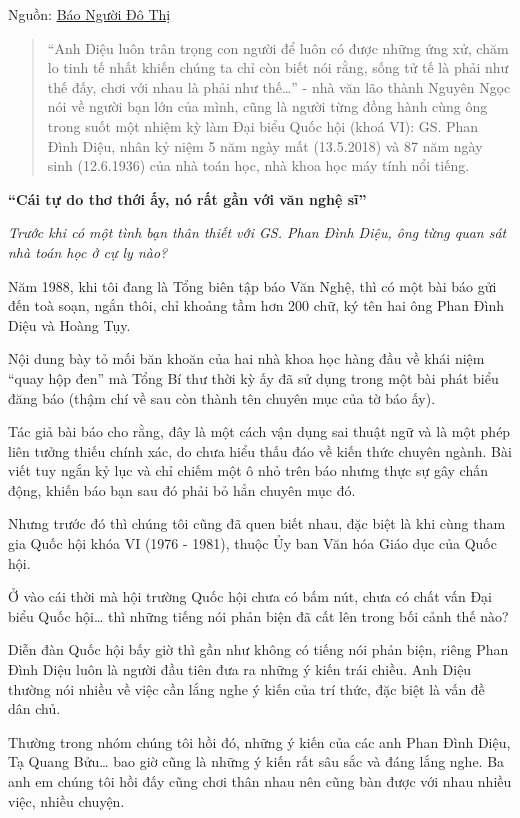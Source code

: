 Nguồn: \href{https://nguoidothi.net.vn/nha-van-nguyen-ngoc-phan-dinh-dieu-da-song-mot-cuoc-doi-rat-dang-hoang-39640.html}{Báo Người Đô Thị}

\begin{quote}
“Anh Diệu luôn trân trọng con người để luôn có được những ứng xử, chăm lo tinh tế nhất khiến chúng ta chỉ còn biết nói rằng, sống tử tế là phải như thế đấy, chơi với nhau là phải như thế…” - nhà văn lão thành Nguyên Ngọc nói về người bạn lớn của mình, cũng là người từng đồng hành cùng ông trong suốt một nhiệm kỳ làm Đại biểu Quốc hội (khoá VI): GS. Phan Đình Diệu, nhân kỷ niệm 5 năm ngày mất (13.5.2018) và 87 năm ngày sinh (12.6.1936) của nhà toán học, nhà khoa học máy tính nổi tiếng.
\end{quote}

{\bf “Cái tự do thơ thới ấy, nó rất gần với văn nghệ sĩ”}

\emph{Trước khi có một tình bạn thân thiết với GS. Phan Đình Diệu, ông từng quan sát nhà toán học ở cự ly nào?}

Năm 1988, khi tôi đang là Tổng biên tập báo Văn Nghệ, thì có một bài báo gửi đến toà soạn, ngắn thôi, chỉ khoảng tầm hơn 200 chữ, ký tên hai ông Phan Đình Diệu và Hoàng Tụy.

Nội dung bày tỏ mối băn khoăn của hai nhà khoa học hàng đầu về khái niệm “quay hộp đen” mà Tổng Bí thư thời kỳ ấy đã sử dụng trong một bài phát biểu đăng báo (thậm chí về sau còn thành tên chuyên mục của tờ báo ấy).

Tác giả bài báo cho rằng, đây là một cách vận dụng sai thuật ngữ và là một phép liên tưởng thiếu chính xác, do chưa hiểu thấu đáo về kiến thức chuyên ngành. Bài viết tuy ngắn kỷ lục và chỉ chiếm một ô nhỏ trên báo nhưng thực sự gây chấn động, khiến báo bạn sau đó phải bỏ hẳn chuyên mục đó.

Nhưng trước đó thì chúng tôi cũng đã quen biết nhau, đặc biệt là khi cùng tham gia Quốc hội khóa VI (1976 - 1981), thuộc Ủy ban Văn hóa Giáo dục của Quốc hội.

Ở vào cái thời mà hội trường Quốc hội chưa có bấm nút, chưa có chất vấn Đại biểu Quốc hội… thì những tiếng nói phản biện đã cất lên trong bối cảnh thế nào?

Diễn đàn Quốc hội bấy giờ thì gần như không có tiếng nói phản biện, riêng Phan Đình Diệu luôn là người đầu tiên đưa ra những ý kiến trái chiều. Anh Diệu thường nói nhiều về việc cần lắng nghe ý kiến của trí thức, đặc biệt là vấn đề dân chủ.

Thường trong nhóm chúng tôi hồi đó, những ý kiến của các anh Phan Đình Diệu, Tạ Quang Bửu… bao giờ cũng là những ý kiến rất sâu sắc và đáng lắng nghe. Ba anh em chúng tôi hồi đấy cũng chơi thân nhau nên cũng bàn được với nhau nhiều việc, nhiều chuyện.

